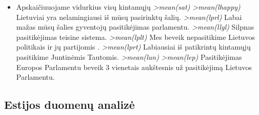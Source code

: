 \documentclass[12pt,a4paper]{article}
\theoremstyle{change}\newtheorem{salyga}{Uždavinys}
\begin{document}
\begin{itemize}
\item Apskaičiuuojame vidurkius visų kintamųjų
\newline \textit{ >mean(sat) 
   }
\newline \textit{ >mean(lhappy) 
   }
\newline Lietuviai yra nelamingiausi iš mūsų pasirinktų šalių.
\newline \textit{ >mean(lprl) 
  }
\newline Labai mažas mūsų šalies gyventojų pasitikėjimas parlamentu.
\newline \textit{ >mean(llgl) 
   }
\newline Silpnas pasitikėjimas teisine sistema.
\newline \textit{ >mean(lplt) 
   }
\newline Mes beveik nepasitikime Lietuvos politikais ir jų partijomis .
\newline \textit{ >mean(lprt)  
   }
\newline Labiausiai iš patikrintų kintamųjų pasitikime Juntinėmis Tautomis.
\newline \textit{ >mean(lun) 
   }
\newline \textit{ >mean(lep) 
   }
\newline Pasitikėjimas Europos Parlamentu beveik 3 vienetais aukštesnis už pasitikėjimą Lietuvos Parlamentu.

\end{itemize}



\subsection{Estijos duomenų analizė}
\end{document}
